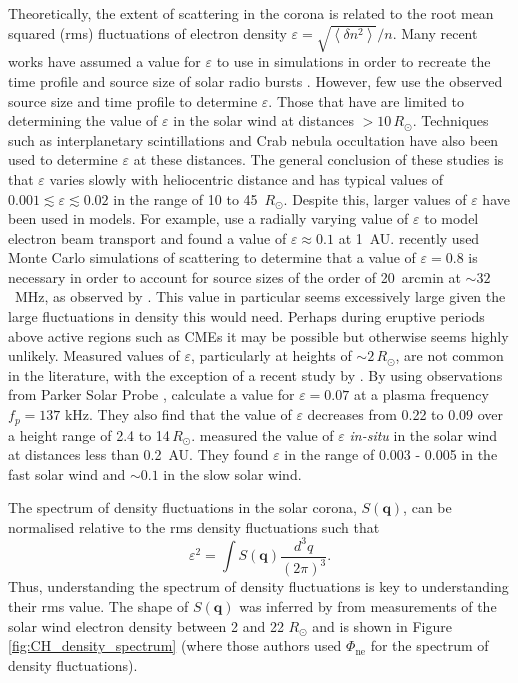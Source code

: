 Theoretically, the extent of scattering in the corona is related to the root mean squared (rms) fluctuations of electron density $\varepsilon = \sqrt{\left< \delta n^2 \right>}/n$. Many recent works have assumed a value for $\varepsilon$ to use in simulations in order to recreate the time profile and source size of solar radio bursts \citep[e.g.][]{Krupar2018, Kontar2019}. However, few use the observed source size and time profile to determine $\varepsilon$. Those that have are limited to determining the value of $\varepsilon$ in the solar wind at distances $> 10 \, R_\odot$. Techniques such as interplanetary scintillations \citep[e.g.][]{Bisoi2014} and Crab nebula occultation \citep{SasikumarRaja2016} have also been used to determine $\varepsilon$ at these distances. The general conclusion of these studies is that $\varepsilon$ varies slowly with heliocentric distance and has typical values of $0.001 \lesssim \varepsilon \lesssim 0.02$ in the range of 10 to 45 $\, R_\odot$. Despite this, larger values of $\varepsilon$ have been used in models. For example, \cite{Reid2010} use a radially varying value of $\varepsilon$ to model electron beam transport and found a value of $\varepsilon \approx 0.1$ at 1~AU. \cite{Kontar2019} recently used Monte Carlo simulations of scattering to determine that a value of $\varepsilon = 0.8$ is necessary in order to account for source sizes of the order of 20~arcmin at $\sim 32$~MHz, as observed by \cite{Kontar2017}. This value in particular seems excessively large given the large fluctuations in density this would need. Perhaps during eruptive periods above active regions such as CMEs it may be possible but otherwise seems highly unlikely. Measured values of $\varepsilon$, particularly at heights of ${\sim} 2 \, R_\odot$, are not common in the literature, with the exception of a recent study by \cite{Krupar2020}. By using observations from Parker Solar Probe \citep[PSP,][]{Fox2016}, \cite{Krupar2020} calculate a value for $\varepsilon = 0.07$ at a plasma frequency $f_p = 137$ kHz. They also find that the value of $\varepsilon$ decreases from 0.22 to 0.09 over a height range of 2.4 to 14$\, R_\odot$. \cite{Woo1995} measured the value of $\varepsilon$ \textit{in-situ} in the solar wind at distances less than 0.2~AU. They found $\varepsilon$ in the range of 0.003 - 0.005 in the fast solar wind and $\sim 0.1$ in the slow solar wind.

The spectrum of density fluctuations in the solar corona, $S(\mathbf{q})$, can be normalised relative to the rms density fluctuations such that \citep[e.g.][]{Kontar2019}
\begin{equation}
\varepsilon^2 = \int S(\mathbf{q})\frac{d^3q}{(2 \pi)^3}.
\end{equation}
Thus, understanding the spectrum of density fluctuations is key to understanding their rms value.
The shape of $S(\mathbf{q})$ was inferred by \cite{Coles1989} from measurements of the solar wind electron density between 2 and 22 $R_\odot$ and is shown in Figure \ref{fig:CH_density_spectrum} (where those authors used $\Phi_{\mbox{ne}}$ for the spectrum of density fluctuations).

